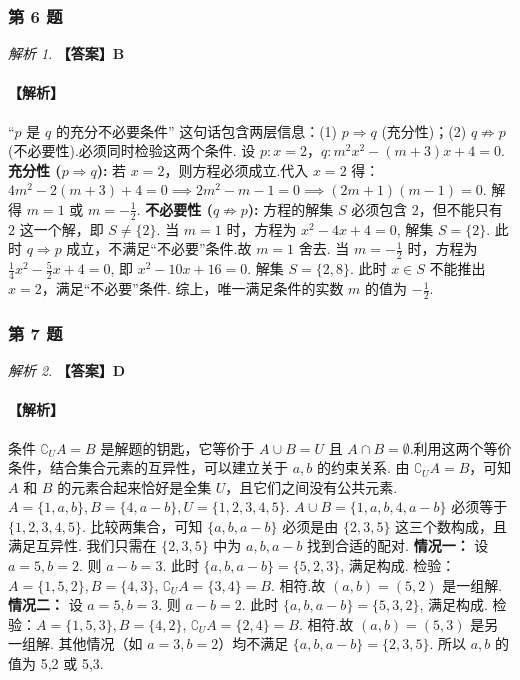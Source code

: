 \documentclass[12pt,a4paper]{ctexbook}
\theoremstyle{definition}
\theoremstyle{remark}
\newtheorem*{solution}{解析}
\begin{document}
	\subsubsection*{第 6 题}
	\begin{solution}
		\textbf{【答案】B}
		\paragraph{【解析】}
		“$p$ 是 $q$ 的充分不必要条件” 这句话包含两层信息：(1) $p \Rightarrow q$ (充分性)；(2) $q \not\Rightarrow p$ (不必要性).必须同时检验这两个条件.
		设 $p: x=2$，$q: m^2x^2 - (m+3)x + 4 = 0$.
		\textbf{充分性 ($p \Rightarrow q$):} 若 $x=2$，则方程必须成立.代入 $x=2$ 得：
		$4m^2 - 2(m+3) + 4 = 0 \implies 2m^2 - m - 1 = 0 \implies (2m+1)(m-1) = 0$.
		解得 $m=1$ 或 $m=-\frac{1}{2}$.
		\textbf{不必要性 ($q \not\Rightarrow p$):} 方程的解集 $S$ 必须包含 $2$，但不能只有 $2$ 这一个解，即 $S \neq \{2\}$.
		当 $m=1$ 时，方程为 $x^2 - 4x + 4 = 0$, 解集 $S=\{2\}$. 此时 $q \Rightarrow p$ 成立，不满足“不必要”条件.故 $m=1$ 舍去.
		当 $m=-\frac{1}{2}$ 时，方程为 $\frac{1}{4}x^2 - \frac{5}{2}x + 4 = 0$, 即 $x^2 - 10x + 16 = 0$. 解集 $S=\{2, 8\}$. 此时 $x \in S$ 不能推出 $x=2$，满足“不必要”条件.
		综上，唯一满足条件的实数 $m$ 的值为 $-\frac{1}{2}$.
	\end{solution}
	
	\subsubsection*{第 7 题}
	\begin{solution}
		\textbf{【答案】D}
		\paragraph{【解析】}
		条件 $∁_U A = B$ 是解题的钥匙，它等价于 $A \cup B = U$ 且 $A \cap B = \emptyset$.利用这两个等价条件，结合集合元素的互异性，可以建立关于 $a,b$ 的约束关系.
		由 $∁_U A = B$，可知 $A$ 和 $B$ 的元素合起来恰好是全集 $U$，且它们之间没有公共元素.
		$A=\{1,a,b\}, B=\{4, a-b\}, U=\{1,2,3,4,5\}$.
		$A \cup B = \{1, a, b, 4, a-b\}$ 必须等于 $\{1,2,3,4,5\}$.
		比较两集合，可知 $\{a, b, a-b\}$ 必须是由 $\{2,3,5\}$ 这三个数构成，且满足互异性.
		我们只需在 $\{2,3,5\}$ 中为 $a, b, a-b$ 找到合适的配对.
		\textbf{情况一：} 设 $a=5, b=2$. 则 $a-b = 3$. 此时 $\{a,b,a-b\} = \{5,2,3\}$, 满足构成.
		检验：$A=\{1,5,2\}, B=\{4,3\}$, $∁_U A = \{3,4\}=B$. 相符.故 $(a,b)=(5,2)$ 是一组解.
		\textbf{情况二：} 设 $a=5, b=3$. 则 $a-b = 2$. 此时 $\{a,b,a-b\} = \{5,3,2\}$, 满足构成.
		检验：$A=\{1,5,3\}, B=\{4,2\}$, $∁_U A = \{2,4\}=B$. 相符.故 $(a,b)=(5,3)$ 是另一组解.
		其他情况（如 $a=3,b=2$）均不满足 $\{a,b,a-b\}=\{2,3,5\}$.
		所以 $a,b$ 的值为 5,2 或 5,3.
	\end{solution}
	
\end{document}
